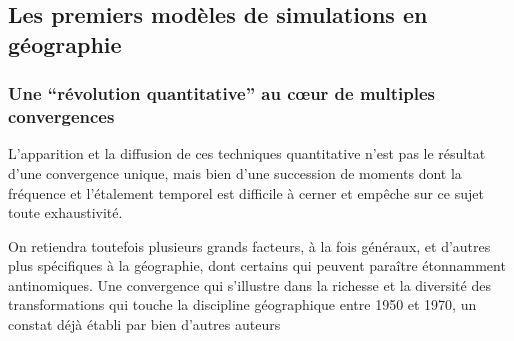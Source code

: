 



\subsection{Les premiers modèles de simulations en géographie}
\label{sec:premier_modele_geo}

\subsubsection{Une \enquote{révolution quantitative} au cœur de multiples convergences}
\label{ssec:revol_quanti}

L'apparition et la diffusion de ces techniques quantitative n'est pas le résultat d'une convergence unique, mais bien d'une succession de moments dont la fréquence et l'étalement temporel est difficile à cerner et empêche sur ce sujet toute exhaustivité. 

On retiendra toutefois plusieurs grands facteurs, à la fois généraux, et d'autres plus spécifiques à la géographie, dont certains qui peuvent paraître étonnamment antinomiques. Une convergence qui s'illustre dans la richesse et la diversité des transformations qui touche la discipline géographique entre 1950 et 1970, un constat déjà établi par bien d'autres auteurs \autocite{Varenne2014}

